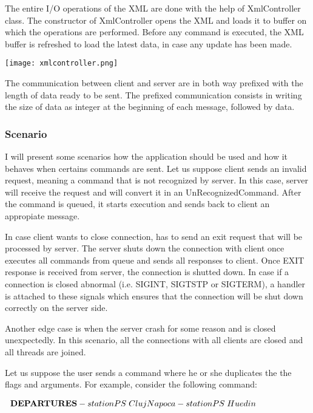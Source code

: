 \documentclass[runningheads]{llncs}
\begin{document}
The entire I/O operations of the XML are done with the help of XmlController class. The constructor of XmlController opens the XML and loads it to buffer on which the operations are performed. Before any command is executed, the XML buffer is refreshed to load the latest data, in case any update has been made.

\texttt{[image: xmlcontroller.png]}



The communication between client and server are in both way prefixed with the length of data ready to be sent. The prefixed communication consists in writing the size of data as integer at the beginning of each message, followed by data.

\subsubsection{Scenario}


I will present some scenarios how the application should be used and how it behaves when certains commands are sent. Let us suppose client sends an invalid request, meaning a command that is not recognized by server. In this case, server will receive the request and will convert it in an UnRecognizedCommand. After the command is queued, it starts execution and sends back to client an appropiate message.

In case client wants to close connection, has to send an exit request that will be processed by server. The server shuts down the connection with client once executes all commands from queue and sends all responses to client. Once EXIT response is received from server, the connection is shutted down. In case if a connection is closed abnormal (i.e. SIGINT, SIGTSTP or SIGTERM), a handler is attached to these signals which ensures that the connection will be shut down correctly on the server side.

Another edge case is when the server crash for some reason and is closed unexpectedly. In this scenario, all the connections with all clients are closed and all threads are joined.

Let us suppose the user sends a command where he or she duplicates the the flags and arguments. For example, consider the following command:

\begin{gather*}
   \hspace*{-2cm}\textbf{DEPARTURES}  -stationPS  \; Cluj Napoca -stationPS  \; Huedin
\end{gather*}
\end{document}
